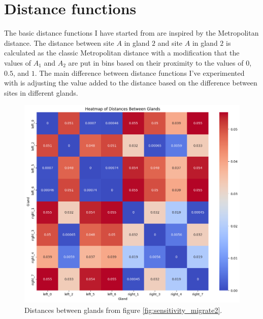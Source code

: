 \section{Distance functions}
The basic distance functions I have started from are inspired by the Metropolitan distance. The distance between site $A$ in gland $2$ and site $A$ in gland $2$ is calculated as the classic Metropolitan distance with a modification that the values of $A_1$ and $A_2$ are put in bins based on their proximity to the values of $0$, $0.5$, and $1$. The main difference between distance functions I've experimented with is adjusting the value added to the distance based on the difference between sites in different glands.
\begin{figure}[h]
    \centering
    \includegraphics[width=\textwidth]{Chapter_methylation/figures/sensitivity_migrate2_distances.png}
    \caption{Distances between glands from figure \ref{fig:sensitivity_migrate2}.}
    \label{fig:distance_functions}
\end{figure}
